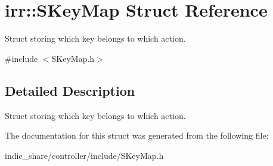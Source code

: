 \hypertarget{structirr_1_1SKeyMap}{}\section{irr\+:\+:S\+Key\+Map Struct Reference}
\label{structirr_1_1SKeyMap}


Struct storing which key belongs to which action.  




{\ttfamily \#include $<$S\+Key\+Map.\+h$>$}



\subsection{Detailed Description}
Struct storing which key belongs to which action. 

The documentation for this struct was generated from the following file\+:\begin{DoxyCompactItemize}
\item 
indie\+\_\+share/controller/include/S\+Key\+Map.\+h\end{DoxyCompactItemize}
